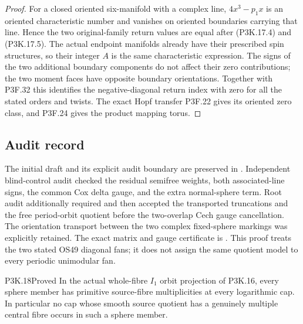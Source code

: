 \begin{proof}
For a closed oriented six-manifold with a complex line,
\(4x^3-p_1x\) is an oriented characteristic number and
vanishes on oriented boundaries carrying that line.  Hence
the two original-family return values are equal after
(P3K.17.4) and (P3K.17.5).  The actual endpoint manifolds
already have their prescribed spin structures, so their
integer \(A\) is the same characteristic expression.
The signs of the two additional boundary components do not
affect their zero contributions; the two moment faces have
opposite boundary orientations.  Together with P3F.32 this identifies the negative-diagonal
return index with zero for all the stated orders and twists.
The exact Hopf transfer P3F.22 gives its oriented zero class,
and P3F.24 gives the product mapping torus.
\end{proof}

\subsection{Audit record}

The initial draft and its explicit audit boundary are preserved in
.
Independent blind-control audit checked the residual semifree weights,
both associated-line signs, the common Cox delta gauge, and the extra
normal-sphere term.  Root audit additionally required and then accepted
the transported truncations and the free period-orbit quotient before
the two-overlap Cech gauge cancellation.  The orientation transport
between the two complex fixed-sphere markings was explicitly retained.
The exact matrix and gauge certificate is .
This proof treats the two stated OS49 diagonal fans; it does not assign
the same quotient model to every periodic unimodular fan.

\begin{statement}{P3K.18}{Proved}
In the actual whole-fibre \(I_1\) orbit projection of P3K.16,
every sphere member has primitive source-fibre multiplicities
at every logarithmic cap.  In particular no cap whose smooth
source quotient has a genuinely multiple central fibre occurs
in such a sphere member.
\end{statement}


